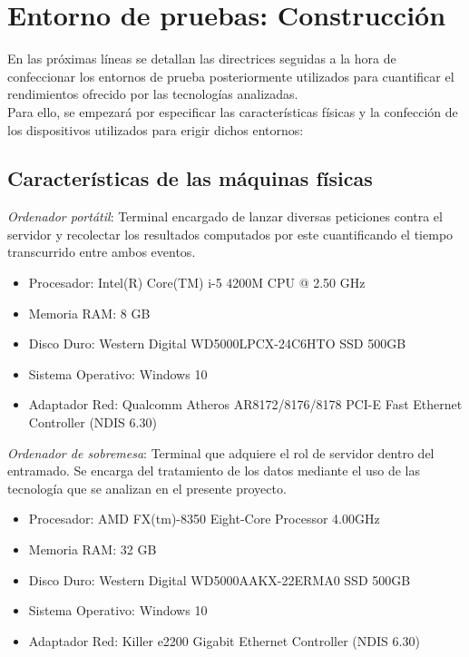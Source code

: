 
\pagestyle{fancy}

\chapter{Entorno de pruebas: Construcción}
\label{entorno_pruebas}

En las próximas líneas se detallan las directrices seguidas a la hora de confeccionar los entornos de prueba posteriormente utilizados para cuantificar el rendimientos ofrecido por las tecnologías analizadas.\\

Para ello, se empezará por especificar las características físicas y la confección de los dispositivos utilizados para erigir dichos entornos:\\

\section{Características de las máquinas físicas}

\textit{Ordenador portátil}: Terminal encargado de lanzar diversas peticiones contra el servidor y recolectar los resultados computados por este cuantificando el tiempo transcurrido entre ambos eventos.\\ 

\begin{itemize}
	\item Procesador: Intel(R) Core(TM) i-5 4200M CPU @ 2.50 GHz
	\item Memoria RAM: 8 GB
	\item Disco Duro: Western Digital WD5000LPCX-24C6HTO SSD 500GB
	\item Sistema Operativo: Windows 10
	\item Adaptador Red: Qualcomm Atheros AR8172/8176/8178 PCI-E Fast Ethernet Controller (NDIS 6.30)
\end{itemize}

\textit{Ordenador de sobremesa}: Terminal que adquiere el rol de servidor dentro del entramado. Se encarga del tratamiento de los datos mediante el uso de las tecnología que se analizan en el presente proyecto.\\

\begin{itemize}
	\item Procesador: AMD FX(tm)-8350 Eight-Core Processor 4.00GHz
	\item Memoria RAM: 32 GB
	\item Disco Duro: Western Digital WD5000AAKX-22ERMA0 SSD 500GB
	\item Sistema Operativo: Windows 10
	\item Adaptador Red: Killer e2200 Gigabit Ethernet Controller (NDIS 6.30)
\end{itemize}


